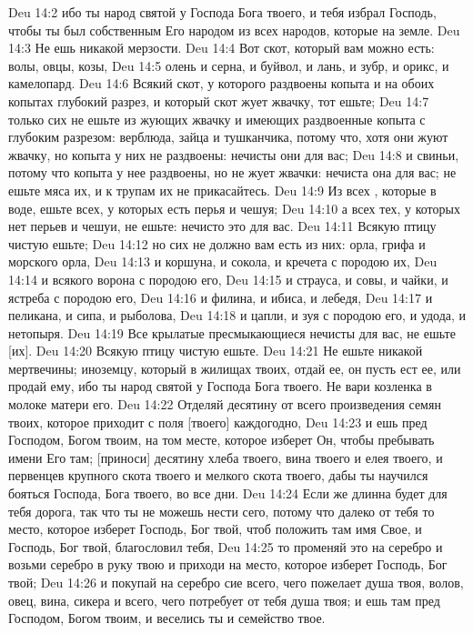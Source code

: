 \vs Deu 14:2 ибо ты народ святой у Господа Бога твоего, и тебя избрал Господь, чтобы ты был собственным Его народом из всех народов, которые на земле.
\rsbpar\vs Deu 14:3 Не ешь никакой мерзости.
\vs Deu 14:4 Вот скот, который вам можно есть: волы, овцы, козы,
\vs Deu 14:5 олень и серна, и буйвол, и лань, и зубр, и орикс, и камелопард.
\vs Deu 14:6 Всякий скот, у которого раздвоены копыта и на обоих копытах глубокий разрез, и который скот жует жвачку, тот ешьте;
\vs Deu 14:7 только сих не ешьте из жующих жвачку и имеющих раздвоенные копыта с глубоким разрезом: верблюда, зайца и тушканчика, потому что, хотя они жуют жвачку, но копыта у них не раздвоены: нечисты они для вас;
\vs Deu 14:8 и свиньи, потому что копыта у нее раздвоены, но не жует жвачки: нечиста она для вас; не ешьте мяса их, и к трупам их не прикасайтесь.
\vs Deu 14:9 Из всех , которые в воде, ешьте всех, у которых есть перья и чешуя;
\vs Deu 14:10 а всех тех, у которых нет перьев и чешуи, не ешьте: нечисто это для вас.
\vs Deu 14:11 Всякую птицу чистую ешьте;
\vs Deu 14:12 но сих не должно вам есть из них: орла, грифа и морского орла,
\vs Deu 14:13 и коршуна, и сокола, и кречета с породою их,
\vs Deu 14:14 и всякого ворона с породою его,
\vs Deu 14:15 и страуса, и совы, и чайки, и ястреба с породою его,
\vs Deu 14:16 и филина, и ибиса, и лебедя,
\vs Deu 14:17 и пеликана, и сипа, и рыболова,
\vs Deu 14:18 и цапли, и зуя с породою его, и удода, и нетопыря.
\vs Deu 14:19 Все крылатые пресмыкающиеся нечисты для вас, не ешьте [их].
\vs Deu 14:20 Всякую птицу чистую ешьте.
\vs Deu 14:21 Не ешьте никакой мертвечины; иноземцу, который  в жилищах твоих, отдай ее, он пусть ест ее, или продай ему, ибо ты народ святой у Господа Бога твоего. Не вари козленка в молоке матери его.
\rsbpar\vs Deu 14:22 Отделяй десятину от всего произведения семян твоих, которое приходит с поля [твоего] каждогодно,
\vs Deu 14:23 и ешь пред Господом, Богом твоим, на том месте, которое изберет Он, чтобы пребывать имени Его там; [приноси] десятину хлеба твоего, вина твоего и елея твоего, и первенцев крупного скота твоего и мелкого скота твоего, дабы ты научился бояться Господа, Бога твоего, во все дни.
\vs Deu 14:24 Если же длинна будет для тебя дорога, так что ты не можешь нести сего, потому что далеко от тебя то место, которое изберет Господь, Бог твой, чтоб положить там имя Свое, и Господь, Бог твой, благословил тебя,
\vs Deu 14:25 то променяй это на серебро и возьми серебро в руку твою и приходи на место, которое изберет Господь, Бог твой;
\vs Deu 14:26 и покупай на серебро сие всего, чего пожелает душа твоя, волов, овец, вина, сикера и всего, чего потребует от тебя душа твоя; и ешь там пред Господом, Богом твоим, и веселись ты и семейство твое.

